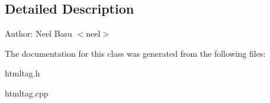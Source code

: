 \subsection{Detailed Description}
\begin{Desc}
\item[Author:]Neel Basu $<$neel$>$ \end{Desc}


The documentation for this class was generated from the following files:\begin{CompactItemize}
\item 
htmltag.h\item 
htmltag.cpp\end{CompactItemize}
